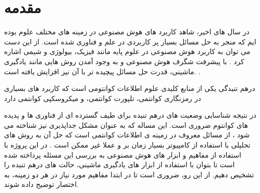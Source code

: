 \section{مقدمه}


در سال های اخیر، شاهد کاربرد های هوش مصنوعی در زمینه های مختلف علوم بوده ایم که منجر به حل مسائل بسیار پر کاربردی در علم و فناوری شده است. از این دست می توان به کاربرد هوش مصنوعی در علوم پایه مانند فیزیک، بیولوژی و شیمی اشاره کرد
\cite{TODO}.
با پیشرفت شگرف هوش مصنوعی و به وجود آمدن روش هایی مانند یادگیری ماشینی، قدرت حل مسائل پیچیده تر با آن نیز افزایش یافته است.
\cite{TODO}.

درهم تنیدگی یکی از منابع کلیدی علوم اطلاعات کوانتومی است که کاربرد های بسیاری در رمزنگاری کوانتمی، تلپورت کوانتمی، و میکروسکپی کوانتمی دارد

در نتیجه شناسایی وضعیت های درهم تنیده برای طیف گسترده ای از فناوری ها و پدیده های کوانتوم ضروری است. این مساله که به عنوان مشکل جداپذیری نیز شناخته می شود
\cite{TODO}،
از مسائل معروف در زمینه ی اطلاعات کوانتمی است که حل آن به روش های تحلیلی با استفاده از کامپیوتر بسیار زمان بر و عملا غیر ممکن است
\cite{gharibia_2010}.
در این پروژه با استفاده از مفاهیم و ابزار های هوش مصنوعی به بررسی این مسئله پرداخته شده است تا بتوان با استفاده از ابزار های یادگیری ماشینی، حالت های درهم تنیده را تشخیص دهیم.
 از این رو، ضروری است تا در ابتدا مفاهیم مورد نیاز در هر دو زمینه، به اختصار توضیح داده شوند.
